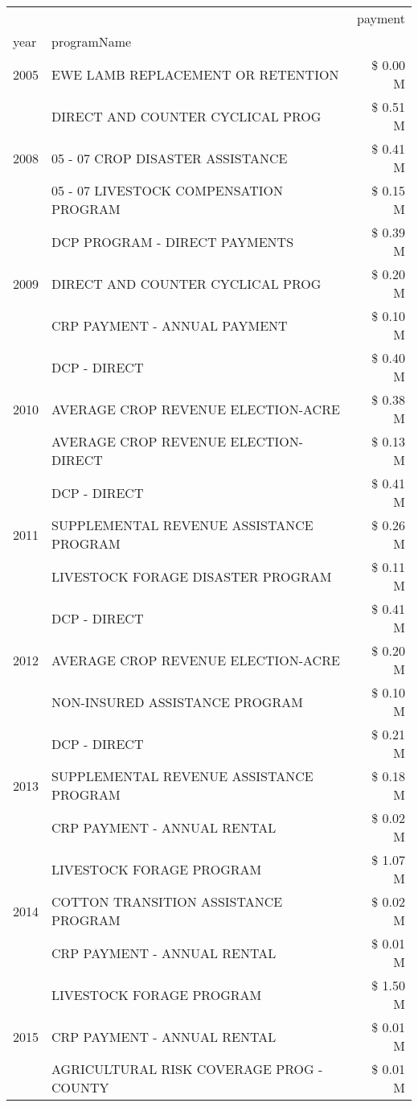\begin{tabular}{llr}
\toprule
 &  & payment \\
year & programName &  \\
\midrule
2005 & EWE LAMB REPLACEMENT OR RETENTION & \$ 0.00 M \\
\cline{1-3}
\multirow[t]{3}{*}{2008} & DIRECT AND COUNTER CYCLICAL PROG & \$ 0.51 M \\
 & 05 - 07 CROP DISASTER ASSISTANCE & \$ 0.41 M \\
 & 05 - 07 LIVESTOCK COMPENSATION PROGRAM & \$ 0.15 M \\
\cline{1-3}
\multirow[t]{3}{*}{2009} & DCP PROGRAM - DIRECT PAYMENTS & \$ 0.39 M \\
 & DIRECT AND COUNTER CYCLICAL PROG & \$ 0.20 M \\
 & CRP PAYMENT - ANNUAL PAYMENT & \$ 0.10 M \\
\cline{1-3}
\multirow[t]{3}{*}{2010} & DCP - DIRECT & \$ 0.40 M \\
 & AVERAGE CROP REVENUE ELECTION-ACRE & \$ 0.38 M \\
 & AVERAGE CROP REVENUE ELECTION-DIRECT & \$ 0.13 M \\
\cline{1-3}
\multirow[t]{3}{*}{2011} & DCP - DIRECT & \$ 0.41 M \\
 & SUPPLEMENTAL REVENUE ASSISTANCE PROGRAM & \$ 0.26 M \\
 & LIVESTOCK FORAGE DISASTER PROGRAM & \$ 0.11 M \\
\cline{1-3}
\multirow[t]{3}{*}{2012} & DCP - DIRECT & \$ 0.41 M \\
 & AVERAGE CROP REVENUE ELECTION-ACRE & \$ 0.20 M \\
 & NON-INSURED ASSISTANCE PROGRAM & \$ 0.10 M \\
\cline{1-3}
\multirow[t]{3}{*}{2013} & DCP - DIRECT & \$ 0.21 M \\
 & SUPPLEMENTAL REVENUE ASSISTANCE PROGRAM & \$ 0.18 M \\
 & CRP PAYMENT - ANNUAL RENTAL & \$ 0.02 M \\
\cline{1-3}
\multirow[t]{3}{*}{2014} & LIVESTOCK FORAGE PROGRAM & \$ 1.07 M \\
 & COTTON TRANSITION ASSISTANCE PROGRAM & \$ 0.02 M \\
 & CRP PAYMENT - ANNUAL RENTAL & \$ 0.01 M \\
\cline{1-3}
\multirow[t]{3}{*}{2015} & LIVESTOCK FORAGE PROGRAM & \$ 1.50 M \\
 & CRP PAYMENT - ANNUAL RENTAL & \$ 0.01 M \\
 & AGRICULTURAL RISK COVERAGE PROG - COUNTY & \$ 0.01 M \\

\end{tabular}
